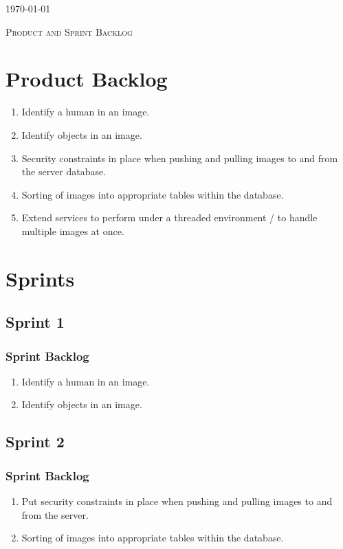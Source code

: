 \documentclass[a4paper,12pt]{report}
\begin{document}
\begin{titlepage}
\begin{center}
		
		{\large \today}
	\end{center}
\end{titlepage}
\footnotesize
\normalsize

\renewcommand{\thesection}{\arabic{section}}
\newpage
\begin{center}
	\textsc{\LARGE Product and Sprint Backlog}\\[1.5cm]
\end{center}
	
\section{Product Backlog}
\begin{enumerate}
	\item Identify a human in an image.  
	\item Identify objects in an image.
	\item Security constraints in place when pushing and pulling images to and from the server database.
	\item Sorting of images into appropriate tables within the database.
	\item Extend services to perform under a threaded environment / to handle multiple images at once.
\end{enumerate}

\section{Sprints}

\subsection{Sprint 1}
\subsubsection{Sprint Backlog}
\begin{enumerate}
	\item Identify a human in an image.
	\item Identify objects in an image.
\end{enumerate}

\subsection{Sprint 2}
\subsubsection{Sprint Backlog}
\begin{enumerate}
	\item Put security constraints in place when pushing and pulling images to and from the server.
	\item Sorting of images into appropriate tables within the database.
\end{enumerate}
\end{document}
